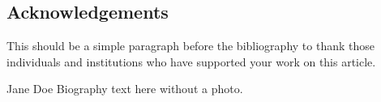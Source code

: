\documentclass[lettersize,journal]{IEEEtran}
\begin{document}
\subsection*{Acknowledgements}
\noindent This should be a simple paragraph before the bibliography to thank those individuals and institutions who have supported your work on this article.





\begin{IEEEbiographynophoto}{Jane Doe}
Biography text here without a photo.
\end{IEEEbiographynophoto}

\end{document}
